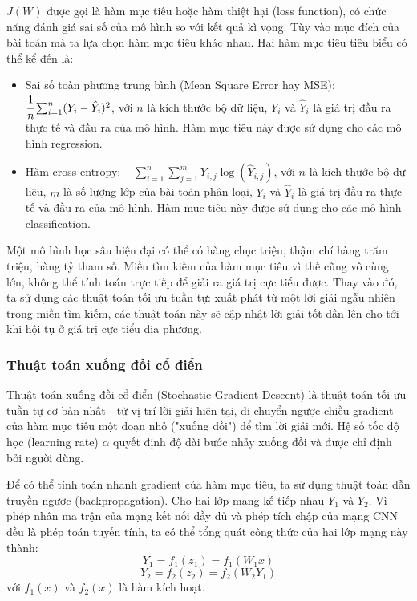 \documentclass[12pt]{extreport}
\begin{document}
$ J(W) $ được gọi là hàm mục tiêu hoặc hàm thiệt hại (loss function), có chức năng đánh giá sai số của mô hình so với kết quả kì vọng. Tùy vào mục đích của bài toán mà ta lựa chọn hàm mục tiêu khác nhau. Hai hàm mục tiêu tiêu biểu có thể kể đến là:
\begin{itemize}
    \item Sai số toàn phương trung bình (Mean Square Error hay MSE): $ \cfrac{1}{n} \sum_{i=1}^{n} (Y_i - \hat{Y}_i)^2 $, với $ n $ là kích thước bộ dữ liệu, $ Y_i $ và $ \hat{Y}_i $ là giá trị đầu ra thực tế và đầu ra của mô hình. Hàm mục tiêu này được sử dụng cho các mô hình regression.
    \item Hàm cross entropy: $ - \sum_{i=1}^{n} \sum_{j=1}^{m} Y_{i, j} \log(\hat{Y}_{i, j}) $, với $ n $ là kích thước bộ dữ liệu, $ m $ là số lượng lớp của bài toán phân loại, $ Y_i $ và $ \hat{Y}_i $ là giá trị đầu ra thực tế và đầu ra của mô hình. Hàm mục tiêu này được sử dụng cho các mô hình classification.
\end{itemize}

Một mô hình học sâu hiện đại có thể có hàng chục triệu, thậm chí hàng trăm triệu, hàng tỷ tham số. Miền tìm kiếm của hàm mục tiêu vì thế cũng vô cùng lớn, không thể tính toán trực tiếp để giải ra giá trị cực tiểu được. Thay vào đó, ta sử dụng các thuật toán tối ưu tuần tự: xuất phát từ một lời giải ngẫu nhiên trong miền tìm kiếm, các thuật toán này sẽ cập nhật lời giải tốt dần lên cho tới khi hội tụ ở giá trị cực tiểu địa phương.

\subsubsection{Thuật toán xuống đồi cổ điển}

Thuật toán xuống đồi cổ điển (Stochastic Gradient Descent) là thuật toán tối ưu tuần tự cơ bản nhất - từ vị trí lời giải hiện tại, di chuyển ngược chiều gradient của hàm mục tiêu một đoạn nhỏ ("xuống đồi") để tìm lời giải mới. Hệ số tốc độ học (learning rate) $ \alpha $ quyết định độ dài bước nhảy xuống đồi và được chỉ định bởi người dùng.

Để có thể tính toán nhanh gradient của hàm mục tiêu, ta sử dụng thuật toán dẫn truyền ngược (backpropagation). Cho hai lớp mạng kế tiếp nhau $ Y_1 $ và $ Y_2 $. Vì phép nhân ma trận của mạng kết nối đầy đủ và phép tích chập của mạng CNN đều là phép toán tuyến tính, ta có thể tổng quát công thức của hai lớp mạng này thành:
$$ Y_1 = f_1(z_1) = f_1(W_1x) $$
$$ Y_2 = f_2(z_2) = f_2(W_2Y_1) $$
với $ f_1(x) $ và $ f_2(x) $ là hàm kích hoạt.
\end{document}
